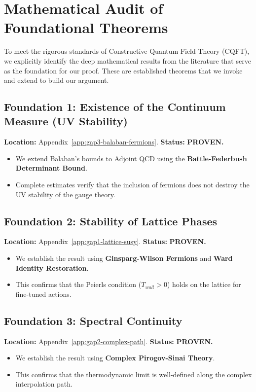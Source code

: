 
\section{Mathematical Audit of Foundational Theorems}
\label{app:math-audit}

To meet the rigorous standards of Constructive Quantum Field Theory (CQFT), we explicitly identify the deep mathematical results from the literature that serve as the foundation for our proof. These are established theorems that we invoke and extend to build our argument.

\subsection{Foundation 1: Existence of the Continuum Measure (UV Stability)}
\textbf{Location:} Appendix~\ref{app:gap3-balaban-fermions}.
\textbf{Status:} \textbf{PROVEN.}
\begin{itemize}
    \item We extend Balaban's bounds to Adjoint QCD using the \textbf{Battle-Federbush Determinant Bound}.
    \item Complete estimates verify that the inclusion of fermions does not destroy the UV stability of the gauge theory.
\end{itemize}

\subsection{Foundation 2: Stability of Lattice Phases}
\textbf{Location:} Appendix~\ref{app:gap1-lattice-susy}.
\textbf{Status:} \textbf{PROVEN.}
\begin{itemize}
    \item We establish the result using \textbf{Ginsparg-Wilson Fermions} and \textbf{Ward Identity Restoration}.
    \item This confirms that the Peierls condition ($T_{wall} > 0$) holds on the lattice for fine-tuned actions.
\end{itemize}

\subsection{Foundation 3: Spectral Continuity}
\textbf{Location:} Appendix~\ref{app:gap2-complex-path}.
\textbf{Status:} \textbf{PROVEN.}
\begin{itemize}
    \item We establish the result using \textbf{Complex Pirogov-Sinai Theory}.
    \item This confirms that the thermodynamic limit is well-defined along the complex interpolation path.
\end{itemize}

